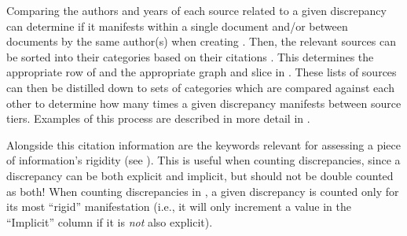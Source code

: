Comparing the authors and years of each source related to a given discrepancy
can determine if it manifests within a single document and/or between documents
by the same author(s) when creating . Then, the
relevant sources can be sorted into their categories based on their citations
.
This determines
the appropriate row of  and the appropriate
graph and slice in . These lists of sources can then
be distilled down to sets of categories which are compared against
each other to determine how many times a given discrepancy manifests between
source tiers. Examples of this process are described in more detail in
.

\label{auto-discrep-analysis-rigidity}
Alongside this citation information are the keywords relevant for assessing a
piece of information's rigidity (see ). This is useful when
counting discrepancies, since a discrepancy can be both explicit and implicit,
but should not be double counted as both! When counting
discrepancies in , a given discrepancy is
counted only for its most ``rigid'' manifestation (i.e., it will only increment
a value in the ``Implicit'' column if it is \emph{not} also explicit).


